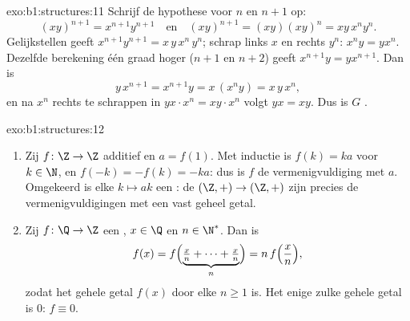 \begin{solution}{exo:b1:structures:11}
Schrijf de hypothese voor $n$ en $n+1$ op:
\[
(xy)^{n+1} = x^{n+1} y^{n+1}
\quad\text{en}\quad
(xy)^{n+1} = (xy)(xy)^n = xy\,x^n y^n .
\]
Gelijkstellen geeft $x^{n+1} y^{n+1} = x\,y\,x^n\,y^n$; schrap links $x$
en rechts $y^n$: $x^n y = y x^n$. Dezelfde berekening één graad hoger
($n+1$ en $n+2$) geeft $x^{n+1} y = y x^{n+1}$. Dan is
\[
y\,x^{n+1} = x^{n+1} y = x\,(x^n y) = x\,y\,x^n ,
\]
en na $x^n$ rechts te schrappen in $y x \cdot x^n = x y \cdot x^n$ volgt
$yx = xy$. Dus is $G$ .
\end{solution}

\begin{solution}{exo:b1:structures:12}
\begin{enumerate}
  \item Zij $f \colon \Z \to \Z$ additief en $a = f(1)$. Met inductie is
        $f(k) = ka$ voor $k \in \N$, en $f(-k) = -f(k) = -ka$: dus is $f$
        de vermenigvuldiging met $a$. Omgekeerd is elke  $k
        \mapsto ak$ een : de  $(\Z,+) \to (\Z,+)$ zijn
        precies de vermenigvuldigingen met een vast geheel getal.
  \item Zij $f \colon \Q \to \Z$ een , $x \in \Q$ en $n \in
        \N^*$. Dan is
        \[
        f(x) = f\Bigl(\underbrace{\tfrac xn + \dots +
        \tfrac xn}_{n}\Bigr) = n\,f\Bigl(\frac xn\Bigr) ,
        \]
        zodat het gehele getal $f(x)$ door elke $n \geq 1$  is.
        Het enige zulke gehele getal is $0$: $f \equiv 0$.
\end{enumerate}
\end{solution}

